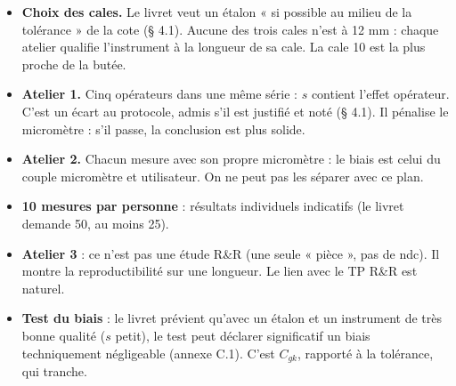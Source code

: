 \documentclass[10pt,a4paper]{article}
\begin{document}
\begin{itemize}
\item \textbf{Choix des cales.} Le livret veut un étalon « si possible au milieu de la tolérance » de la cote (§ 4.1). Aucune des trois cales n'est à 12 mm : chaque atelier qualifie l'instrument à la longueur de sa cale. La cale 10 est la plus proche de la butée.
\item \textbf{Atelier 1.} Cinq opérateurs dans une même série : $s$ contient l'effet opérateur. C'est un écart au protocole, admis s'il est justifié et noté (§ 4.1). Il pénalise le micromètre : s'il passe, la conclusion est plus solide.
\item \textbf{Atelier 2.} Chacun mesure avec son propre micromètre : le biais est celui du couple micromètre et utilisateur. On ne peut pas les séparer avec ce plan.
\item \textbf{10 mesures par personne} : résultats individuels indicatifs (le livret demande 50, au moins 25).
\item \textbf{Atelier 3} : ce n'est pas une étude R\&R (une seule « pièce », pas de ndc). Il montre la reproductibilité sur une longueur. Le lien avec le TP R\&R est naturel.
\item \textbf{Test du biais} : le livret prévient qu'avec un étalon et un instrument de très bonne qualité ($s$ petit), le test peut déclarer significatif un biais techniquement négligeable (annexe C.1). C'est $C_{gk}$, rapporté à la tolérance, qui tranche.
\end{itemize}
\end{document}
